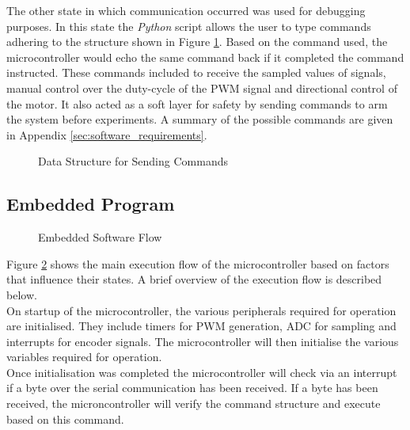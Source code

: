 The other state in which communication occurred was used for debugging purposes. In this state the \textit{Python} script allows the user to type commands adhering to the structure shown in Figure \ref{fig:uart_struct}. Based on the command used, the microcontroller would echo the same command back if it completed the command instructed. These commands included to receive the sampled values of signals, manual control over the duty-cycle of the PWM signal and directional control of the motor. It also acted as a soft layer for safety by sending commands to arm the system before experiments. A summary of the possible commands are given in Appendix \ref{sec:software_requirements}.


\begin{figure}[h]
	\centering
	
	\caption{Data Structure for Sending Commands}
	\label{fig:uart_struct}
\end{figure}


\subsection{Embedded Program}

\begin{figure}[h]
\centering

\caption{Embedded Software Flow}
\label{fig:software_flow}
\end{figure}


Figure \ref{fig:software_flow} shows the main execution flow of the microcontroller based on factors that influence their states. A brief overview of the execution flow is described below.\\

On startup of the microcontroller, the various peripherals required for operation are initialised. They include timers for PWM generation, ADC for sampling and interrupts for encoder signals. The microcontroller will then initialise the various variables required for operation.\\

Once initialisation was completed the microcontroller will check via an interrupt if a byte over the serial communication has been received. If a byte has been received, the microncontroller will verify the command structure and execute based on this command.\\

